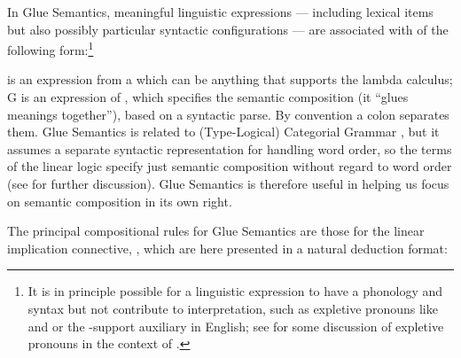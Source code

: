 In Glue Semantics, meaningful
linguistic expressions --- including lexical items but also possibly
particular syntactic configurations --- are associated
with  of the following form:\footnote{It is
in principle possible for a linguistic expression to have a phonology
and syntax but not contribute to interpretation, such as expletive
pronouns like  and  or the -support
auxiliary in English; see \citet[113]{asudeh-lpr} for some discussion of
expletive pronouns in the context of \glue.}
\begin{exe}
\ex {}
\end{exe}
%
 is an expression from a 
which can be anything that supports the lambda calculus; G is an
expression of  \citep{girard87}, which 
specifies the semantic composition (it ``glues meanings
together''), based on a syntactic parse.  By convention a colon separates them. Glue Semantics is related to (Type-Logical) Categorial
Grammar \citep{carpenter97,morrill94a,morrill11,moortgat97}, but it
assumes a separate syntactic representation for handling word order,
so the terms of the linear logic specify just semantic
composition without regard to word order 
(see \citealt{asudeh-lpr} for further discussion). Glue Semantics is
therefore useful in helping us focus on semantic composition in its
own right.

The principal compositional rules for Glue Semantics are those for the
linear implication connective, \linimp, which are here presented in a
natural deduction format:
%
%  
%
  

